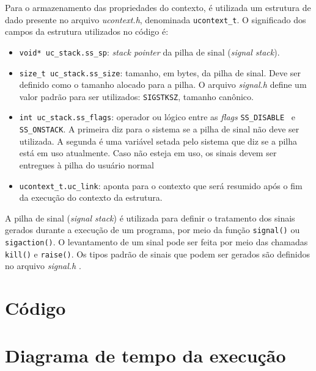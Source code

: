 \documentclass [12pt,oneside] {article}
\begin{document}
Para o armazenamento das propriedades do contexto, é utilizada um estrutura de dado presente no arquivo \emph{ucontext.h}, denominada \texttt{ucontext\_t}. O significado dos campos da estrutura utilizados no código é:

\begin{itemize}
	\item \texttt{void* uc\_stack.ss\_sp}: \emph{stack pointer} da pilha de sinal (\emph{signal stack}).
	\item \texttt{size\_t uc\_stack.ss\_size}: tamanho, em bytes, da pilha de sinal. Deve ser definido como o tamanho alocado para a pilha. O arquivo \emph{signal.h} define um valor padrão para ser utilizados: \texttt{SIGSTKSZ}, tamanho canônico.
	\item \texttt{int uc\_stack.ss\_flags}: operador ou lógico entre as \emph{flags} \texttt{SS\_DISABLE } e\\ \texttt{SS\_ONSTACK}. A primeira diz para o sistema se a pilha de sinal não deve ser utilizada. A segunda é uma variável setada pelo sistema que diz se a pilha está em uso atualmente. Caso não esteja em uso, os sinais devem ser entregues à pilha do usuário normal 
	\item \texttt{ucontext\_t.uc\_link}: aponta para o contexto que será resumido após o fim da execução do contexto da estrutura.
\end{itemize}

A pilha de sinal (\emph{signal stack}) é utilizada para definir o tratamento dos sinais gerados durante a execução de um programa, por meio da função \texttt{signal()} ou \texttt{sigaction()}. O levantamento de um sinal pode ser feita por meio das chamadas \texttt{kill()} e \texttt{raise()}. Os tipos padrão de sinais que podem ser gerados são definidos no arquivo \emph{signal.h} \cite{ManualGNU2019}.

\section{Código}

\section{Diagrama de tempo da execução}



\end{document}
